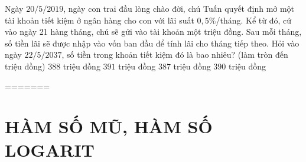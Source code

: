\begin{ex}%
	Ngày $20/5/2019$, ngày con trai đầu lòng chào đời, chú Tuấn quyết định mở một tài khoản tiết kiệm ở ngân hàng cho con với lãi suất $0,5\%$/tháng. Kể từ đó, cứ vào ngày 21 hàng tháng, chú sẽ gửi vào tài khoản một triệu đồng. Sau mỗi tháng, số tiền lãi sẽ được nhập vào vốn ban đầu để tính lãi cho tháng tiếp theo. Hỏi vào ngày $22/5/2037$, số tiền trong khoản tiết kiệm đó là bao nhiêu? (làm tròn đến triệu đồng)
	\choice
	{$388$ triệu đồng}
	{$391$ triệu đồng}
	{$387$ triệu đồng}
	{\True $390$ triệu đồng}
\end{ex}

=======

\section{HÀM SỐ MŨ, HÀM SỐ LOGARIT}
